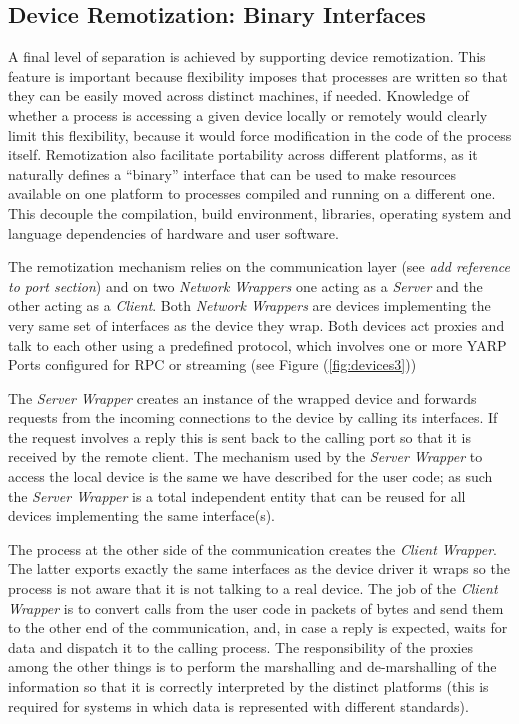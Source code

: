 \subsection{Device Remotization: Binary Interfaces}
A final level of separation is achieved by supporting device remotization. 
This feature is important because flexibility imposes 
that processes are written so that they can be easily moved across 
distinct machines, if needed. Knowledge of whether a process is accessing 
a given device locally or remotely would clearly limit this flexibility, 
because it would force modification in the code of the process itself. 
Remotization also facilitate portability across different platforms, as 
it naturally defines a ``binary'' interface that can 
be used to make resources available on one platform to processes compiled 
and running on a different one. This decouple the compilation, build 
environment, libraries, operating system and language dependencies of 
hardware and user software.

The remotization mechanism relies on the communication layer (see \emph{add 
reference to port section}) and on two \emph{Network Wrappers} one acting 
as a \emph{Server} and the other acting as a \emph{Client}. 
Both \emph{Network Wrappers} are devices implementing the very same set 
of interfaces as the device they wrap. Both devices act proxies and talk 
to each other using a predefined protocol, which involves one or more 
YARP Ports configured for RPC or streaming (see Figure (\ref{fig:devices3}))

The \emph{Server Wrapper} creates an instance of the wrapped device and 
forwards requests from the incoming connections to the device by calling 
its interfaces. If the request involves a reply this is sent back to the 
calling port so that it is received by the remote client. The mechanism 
used by the \emph{Server Wrapper} to access the local device is the same 
we have described for the user code; as 
such the \emph{Server Wrapper} is a total independent entity that can be 
reused for all devices implementing the same interface(s). 

The process at the other side of the communication creates the 
\emph{Client Wrapper}. The latter exports exactly the same interfaces as the 
device driver it wraps so the process is not aware that it is not talking to 
a real device. The job of the \emph{Client Wrapper} is to convert calls from 
the user code in packets of bytes and send them to the other end of the 
communication, and, in case a reply is expected, waits for data and dispatch 
it to the calling process. The responsibility of the proxies among the other 
things is to perform the marshalling and de-marshalling of the information 
so that it is correctly interpreted by the distinct platforms (this is 
required for systems in which data is represented with different standards).

